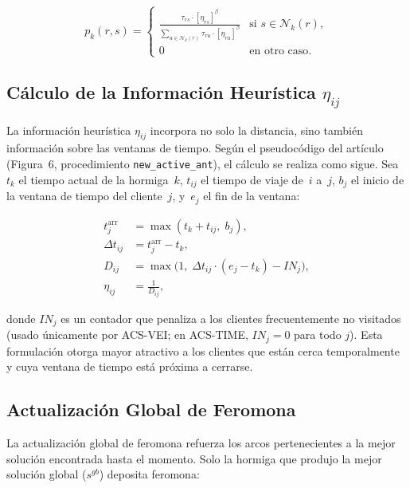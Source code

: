 \documentclass[12pt, letterpaper]{article}
\begin{document}
\begin{equation}
  \label{eq:probabilidad_exploracion}
  p_k(r, s) =
  \begin{cases}
    \displaystyle\frac{\tau_{rs} \cdot [\eta_{rs}]^{\beta}}
    {\displaystyle\sum_{u \in \mathcal{N}_k(r)} \tau_{ru} \cdot [\eta_{ru}]^{\beta}}
    & \text{si } s \in \mathcal{N}_k(r), \\[12pt]
    0 & \text{en otro caso}.
  \end{cases}
\end{equation}

\subsection{Cálculo de la Información Heurística \texorpdfstring{$\eta_{ij}$}{η\_ij}}
\label{subsec:eta}

La información heurística $\eta_{ij}$ incorpora no solo la distancia, sino también información sobre las ventanas de tiempo. Según el pseudocódigo del artículo~\cite{gambardella1999} (Figura~6, procedimiento \texttt{new\_active\_ant}), el cálculo se realiza como sigue. Sea~$t_k$ el tiempo actual de la hormiga~$k$, $t_{ij}$ el tiempo de viaje de~$i$ a~$j$, $b_j$ el inicio de la ventana de tiempo del cliente~$j$, y~$e_j$ el fin de la ventana:

\begin{align}
  t_j^{\text{arr}} &= \max(t_k + t_{ij},\; b_j), \label{eq:arrival}\\
  \Delta t_{ij} &= t_j^{\text{arr}} - t_k, \label{eq:delta}\\
  D_{ij} &= \max\bigl(1,\; \Delta t_{ij} \cdot (e_j - t_k) - IN_j\bigr), \label{eq:distance_composite}\\
  \eta_{ij} &= \frac{1}{D_{ij}}, \label{eq:eta}
\end{align}

\noindent donde $IN_j$ es un contador que penaliza a los clientes frecuentemente no visitados (usado únicamente por ACS-VEI; en ACS-TIME, $IN_j = 0$ para todo $j$). Esta formulación otorga mayor atractivo a los clientes que están cerca temporalmente y cuya ventana de tiempo está próxima a cerrarse.

\subsection{Actualización Global de Feromona}
\label{subsec:actualizacion_global}

La actualización global de feromona refuerza los arcos pertenecientes a la mejor solución encontrada hasta el momento. Solo la hormiga que produjo la mejor solución global ($s^{gb}$) deposita feromona:
\end{document}
